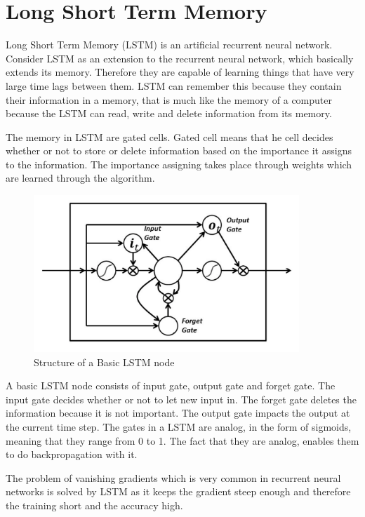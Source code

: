 \section{Long Short Term Memory}

Long Short Term Memory (LSTM) is an artificial recurrent neural network.
Consider LSTM as an extension to the recurrent neural network, which basically
extends its memory. Therefore they are capable of learning things that have very
large time lags between them. LSTM can remember this because they contain their
information in a memory, that is much like the memory of a computer because the
LSTM can read, write and delete information from its memory.

The memory in LSTM are gated cells. Gated cell means that he cell decides
whether or not to store or delete information based on the importance it assigns
to the information. The importance assigning takes place through weights which
are learned through the algorithm.

\begin{figure}
	\caption{Structure of a Basic LSTM node}
	\centering\includegraphics[width=10cm]{4.png}
\end{figure}

A basic LSTM node consists of input gate, output gate and forget gate. The input
gate decides whether or not to let new input in. The forget gate deletes the
information because it is not important. The output gate impacts the output at
the current time step. The gates in a LSTM are analog, in the form of sigmoids,
meaning that they range from 0 to 1. The fact that they are analog, enables them
to do backpropagation with it.

The problem of vanishing gradients which is very common in recurrent neural
networks is solved by LSTM as it keeps the gradient steep enough and therefore
the training short and the accuracy high.
